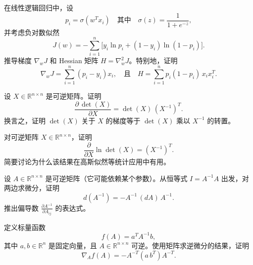 \begin{exercise}
   在线性逻辑回归中，设
   \[
      p_i = \sigma(w^T x_i) \quad \text{其中} \quad \sigma(z)=\frac{1}{1+e^{-z}},
   \]
   并考虑负对数似然
   \[
      J(w) = -\sum_{i=1}^n \Big[y_i\ln p_i + (1-y_i)\ln(1-p_i)\Big].
   \]
   推导梯度 $\nabla_w J$ 和 Hessian 矩阵 $H = \nabla^2_w J$。特别地，证明
   \[
      \nabla_w J = \sum_{i=1}^n (p_i - y_i)x_i, \quad \text{且} \quad H = \sum_{i=1}^n p_i(1-p_i)\,x_i x_i^T.
   \]
\end{exercise}

\begin{exercise}
   设 $X \in \mathbb{R}^{n\times n}$ 是可逆矩阵。证明
   \[
      \frac{\partial\,\det(X)}{\partial X} = \det(X)\,(X^{-1})^T.
   \]
   换言之，证明 $\det(X)$ 关于 $X$ 的梯度等于 $\det(X)$ 乘以 $X^{-1}$ 的转置。
\end{exercise}

\begin{exercise}
   对可逆矩阵 $X \in \mathbb{R}^{n\times n}$，证明
   \[
      \frac{\partial}{\partial X}\ln\det(X) = (X^{-1})^T.
   \]
   简要讨论为什么该结果在高斯似然等统计应用中有用。
\end{exercise}

\begin{exercise}
   设 $A \in \mathbb{R}^{n\times n}$ 是可逆矩阵（它可能依赖某个参数）。从恒等式 $I = A^{-1}A$ 出发，对两边求微分，证明
   \[
      d(A^{-1}) = -A^{-1}\,(dA)\,A^{-1}.
   \]
   推出偏导数 $\frac{\partial A^{-1}}{\partial A_{ij}}$ 的表达式。
\end{exercise}

\begin{exercise}
   定义标量函数
   \[
      f(A)=a^T A^{-1} b,
   \]
   其中 $a,b\in\mathbb{R}^n$ 是固定向量，且 $A\in\mathbb{R}^{n\times n}$ 可逆。使用矩阵求逆微分的结果，证明
   \[
      \nabla_A f(A) = -A^{-T}(a\,b^T)A^{-T}.
   \]
\end{exercise}

